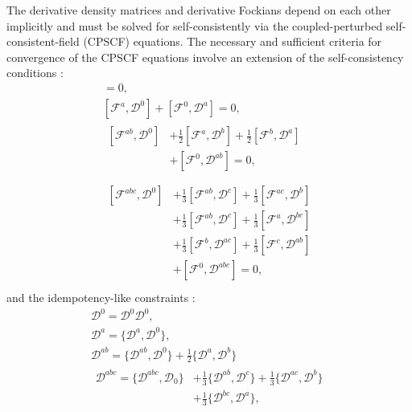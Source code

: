 \documentclass[prl,aps,letterpaper,twocolumn,showpacs,twocolumngrid,superbib]{revtex4}
\def\F{\mathcal{F}}
\def\D{\mathcal{D}}
\begin{document}
The derivative density matrices and derivative Fockians depend on 
each other implicitly and must be solved for self-consistently
via the coupled-perturbed self-consistent-field (CPSCF) equations.
The necessary and sufficient criteria for convergence of the 
CPSCF equations involve an extension of the self-consistency conditions \cite{Furche_2001}:
\begin{gather}
    [\F^{0} ,\D^{0}]=0,\label{eq:commutators1}\\
    [\F^{a} ,\D^{0}]+[\F^{0},\D^{a}]=0,\label{eq:commutators2}\\
  \begin{split}
    [\F^{ab},\D^{0}]&+\frac{1}{2}[\F^{a},\D^{b}]+\frac{1}{2}[\F^{b},\D^{a}] \\
    &+[\F^{0},\D^{ab}]=0,\label{eq:commutators3}\\
  \end{split}\\
  \begin{split}
    [\F^{abc},\D^{0}]&+\frac{1}{3}[\F^{ab},\D^{c}]+\frac{1}{3}[\F^{ac},\D^{b}]\\
    &+\frac{1}{3}[\F^{ab},\D^{c}]+\frac{1}{3}[\F^{a},\D^{bc}]\\
    &+\frac{1}{3}[\F^{b},\D^{ac}]+\frac{1}{3}[\F^{c},\D^{ab}]\\
    &+[\F^{0},\D^{abc}]=0,\label{eq:commutators4}\\
  \end{split}
\end{gather}
and the idempotency-like constraints \cite{Furche_2001}:
\begin{gather}
  \D^{0} =\D^{0} \D^{0},\label{eq:anticommutators1}\\
  \D^{a} =\{\D^{a},\D^{0}\},\label{eq:anticommutators2}\\
  \D^{ab}=\{\D^{ab},\D^{0}\}+\frac{1}{2}\{\D^{a},\D^{b}\}\label{eq:anticommutators3}\\
  \begin{split}
    \D^{abc}=\{\D^{abc},\D_0\}&+\frac{1}{3}\{\D^{ab},\D^{c}\}+\frac{1}{3}\{\D^{ac},\D^{b}\}\\
    &+\frac{1}{3}\{\D^{bc},\D^{a}\}\label{eq:anticommutators4},
  \end{split}
\end{gather}
\end{document}
